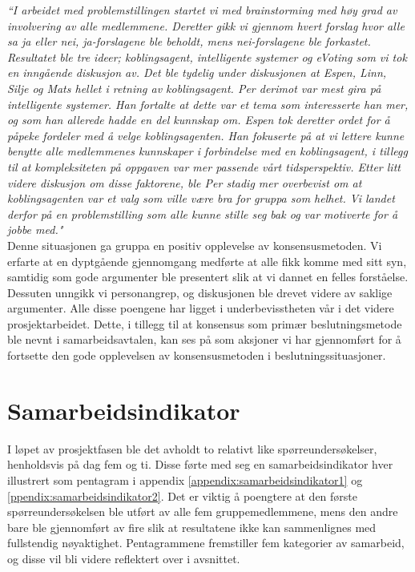 \textit{``I arbeidet med problemstillingen startet vi med brainstorming med høy grad av involvering av alle medlemmene. Deretter gikk vi gjennom hvert forslag hvor alle sa ja eller nei, ja-forslagene ble beholdt, mens nei-forslagene ble forkastet. Resultatet ble tre ideer; koblingsagent, intelligente systemer og eVoting som vi tok en inngående diskusjon av. Det ble tydelig under diskusjonen at Espen, Linn, Silje og Mats hellet i retning av koblingsagent. Per derimot var mest gira på intelligente systemer. Han fortalte at dette var et tema som interesserte han mer, og som han allerede hadde en del kunnskap om. Espen tok deretter ordet for å påpeke fordeler med å velge koblingsagenten. Han fokuserte på at vi lettere kunne benytte alle medlemmenes kunnskaper i forbindelse med en koblingsagent, i tillegg til at kompleksiteten på oppgaven var mer passende vårt tidsperspektiv. Etter litt videre diskusjon om disse faktorene, ble Per stadig mer overbevist om at koblingsagenten var et valg som ville være bra for gruppa som helhet. Vi landet derfor på en problemstilling som alle kunne stille seg bak og var motiverte for å jobbe med."}\\

Denne situasjonen ga gruppa en positiv opplevelse av konsensusmetoden. Vi erfarte at en dyptgående gjennomgang medførte at alle fikk komme med sitt syn, samtidig som gode argumenter ble presentert slik at vi dannet en felles forståelse. Dessuten unngikk vi personangrep, og diskusjonen ble drevet videre av saklige argumenter. Alle disse poengene har ligget i underbevisstheten vår i det videre prosjektarbeidet. Dette, i tillegg til at konsensus som primær beslutningsmetode ble nevnt i samarbeidsavtalen, kan ses på som aksjoner vi har gjennomført for å fortsette den gode opplevelsen av konsensusmetoden i beslutningssituasjoner.\\


\section{Samarbeidsindikator}
\label{sec:samarbeidsindikator}
I løpet av prosjektfasen ble det avholdt to relativt like spørreundersøkelser, henholdsvis på dag fem og ti. Disse førte med seg en samarbeidsindikator hver illustrert som pentagram i appendix \ref{appendix:samarbeidsindikator1} og \ref{ppendix:samarbeidsindikator2}. Det er viktig å poengtere at den første spørreundersøkelsen ble utført av alle fem gruppemedlemmene, mens den andre bare ble gjennomført av fire slik at resultatene ikke kan sammenlignes med fullstendig nøyaktighet. Pentagrammene fremstiller fem kategorier av samarbeid, og disse vil bli videre reflektert over i avsnittet.\\

